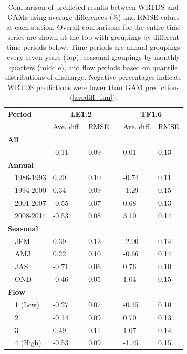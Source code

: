 \documentclass[letterpaper,12pt,oneside]{article}\usepackage[]{graphicx}\usepackage[]{color}
\begin{document}
\begin{table}[!tbp]
\caption{Comparison of predicted results between \ac{WRTDS} and \acp{GAM} using average differences (\%) and \ac{RMSE} values at each station.  Overall comparisons for the entire time series are shown at the top with groupings by different time periods below.  Time periods are annual groupings every seven years (top), seasonal groupings by monthly quarters (middle), and flow periods based on quantile distributions of discharge. Negative percentages indicate \ac{WRTDS} predictions were lower than \ac{GAM} predictions (\cref{avediff_fun}).\label{tab:perfbtw}} 
\begin{center}
\begin{tabular}{lllcll}
\hline\hline
\multicolumn{1}{l}{\bfseries Period}&\multicolumn{2}{c}{\bfseries LE1.2}&\multicolumn{1}{c}{\bfseries }&\multicolumn{2}{c}{\bfseries TF1.6}\tabularnewline
\cline{2-3} \cline{5-6}
\multicolumn{1}{l}{}&\multicolumn{1}{c}{Ave. diff.}&\multicolumn{1}{c}{\ac{RMSE}}&\multicolumn{1}{c}{}&\multicolumn{1}{c}{Ave. diff.}&\multicolumn{1}{c}{\ac{RMSE}}\tabularnewline
\hline
{\bfseries All}&&&&&\tabularnewline
~~&-0.11&0.09&& 0.01&0.13\tabularnewline
\hline
{\bfseries Annual}&&&&&\tabularnewline
~~1986-1993& 0.20&0.10&&-0.74&0.11\tabularnewline
~~1994-2000& 0.34&0.09&&-1.29&0.15\tabularnewline
~~2001-2007&-0.55&0.07&& 0.68&0.13\tabularnewline
~~2008-2014&-0.53&0.08&& 3.10&0.14\tabularnewline
\hline
{\bfseries Seasonal}&&&&&\tabularnewline
~~JFM& 0.39&0.12&&-2.00&0.14\tabularnewline
~~AMJ& 0.22&0.10&&-0.66&0.14\tabularnewline
~~JAS&-0.71&0.06&& 0.76&0.10\tabularnewline
~~OND&-0.46&0.05&& 1.04&0.15\tabularnewline
\hline
{\bfseries Flow}&&&&&\tabularnewline
~~1 (Low)&-0.27&0.07&&-0.15&0.10\tabularnewline
~~2&-0.14&0.09&& 0.70&0.13\tabularnewline
~~3& 0.49&0.11&& 1.07&0.14\tabularnewline
~~4 (High)&-0.53&0.09&&-1.75&0.15\tabularnewline
\hline
\end{tabular}\end{center}

\end{table}
\end{document}

